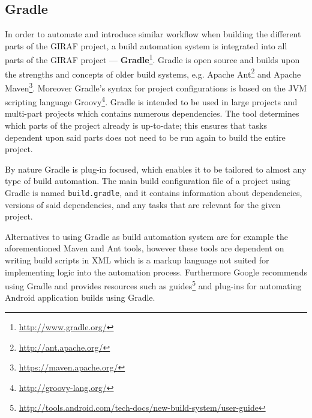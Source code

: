 \subsection{Gradle}\label{subsec:gradle}
In order to automate and introduce similar workflow when building the different parts of the GIRAF project, a build automation system is integrated into all parts of the GIRAF project --- \textbf{Gradle}\footnote{\url{http://www.gradle.org/}}.
Gradle is open source and builds upon the strengths and concepts of older build systems, e.g. Apache Ant\footnote{\url{http://ant.apache.org/}} and Apache Maven\footnote{\url{https://maven.apache.org/}}.
Moreover Gradle's syntax for project configurations is based on the JVM scripting language Groovy\footnote{\url{http://groovy-lang.org/}}.
Gradle is intended to be used in large projects and multi-part projects which contains numerous dependencies.
The tool determines which parts of the project already is up-to-date; this ensures that tasks dependent upon said parts does not need to be run again to build the entire project.

By nature Gradle is plug-in focused, which enables it to be tailored to almost any type of build automation.
The main build configuration file of a project using Gradle is named \texttt{build.gradle}, and it contains information about dependencies, versions of said dependencies, and any tasks that are relevant for the given project.

Alternatives to using Gradle as build automation system are for example the aforementioned Maven and Ant tools, however these tools are dependent on writing build scripts in XML which is a markup language not suited for implementing logic into the automation process.
Furthermore Google recommends using Gradle and provides resources such as guides\footnote{\url{http://tools.android.com/tech-docs/new-build-system/user-guide}} and plug-ins for automating Android application builds using Gradle.
